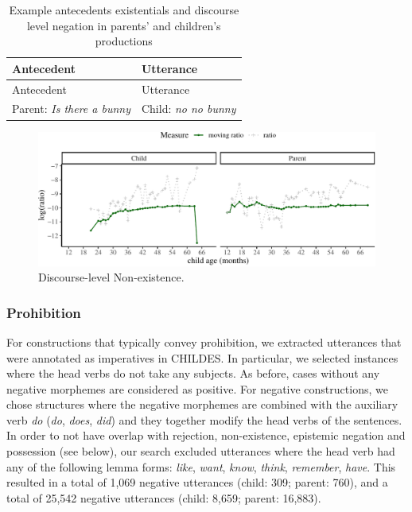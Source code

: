 \documentclass[
  english,
  man,floatsintext]{apa6}
\begin{document}
\begin{longtable}[]{@{}ll@{}}
\caption{\label{tab:disexist} Example antecedents existentials and discourse level negation in parents' and children's productions}\tabularnewline
\toprule
Antecedent & Utterance \\
\midrule
\endfirsthead
\toprule
Antecedent & Utterance \\
\midrule
\endhead
Parent: \emph{Is there a bunny} & Child: \emph{no no bunny} \\
\bottomrule
\end{longtable}

\begin{figure}[H]

{\centering \includegraphics{neg_construction_article_files/figure-latex/existencediscourse-1} 

}

\caption{Discourse-level Non-existence.}\label{fig:existencediscourse}
\end{figure}

\hypertarget{prohibition}{%
\subsubsection{Prohibition}\label{prohibition}}

For constructions that typically convey prohibition, we extracted utterances that were annotated as imperatives in CHILDES. In particular, we selected instances where the head verbs do not take any subjects. As before, cases without any negative morphemes are considered as positive. For negative constructions, we chose structures where the negative morphemes are combined with the auxiliary verb \emph{do} (\emph{do}, \emph{does}, \emph{did}) and they together modify the head verbs of the sentences. In order to not have overlap with rejection, non-existence, epistemic negation and possession (see below), our search excluded utterances where the head verb had any of the following lemma forms: \emph{like}, \emph{want}, \emph{know}, \emph{think}, \emph{remember}, \emph{have}. This resulted in a total of 1,069 negative utterances (child: 309; parent: 760), and a total of 25,542 negative utterances (child: 8,659; parent: 16,883).
\end{document}
